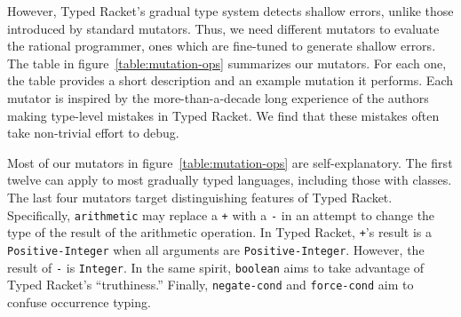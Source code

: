However, Typed Racket's gradual type system detects shallow errors, unlike those introduced by standard mutators.
Thus, we need different mutators to evaluate the rational programmer, ones which are fine-tuned to generate shallow errors.
The table in figure~\ref{table:mutation-ops} summarizes our mutators.
For each one, the table provides a short description and an example
mutation it performs. Each mutator is inspired by the more-than-a-decade
long experience of the authors making type-level mistakes in Typed Racket.
We find that these mistakes often take non-trivial effort to debug.

Most of our mutators in figure~\ref{table:mutation-ops} are self-explanatory.
The first twelve can apply to most gradually typed languages, including those with classes.
The last four mutators target distinguishing features of Typed Racket.
Specifically, \texttt{arithmetic} may replace a \texttt{+} with a \texttt{-}
in an attempt to change the type of the result of the arithmetic
operation. In Typed Racket, \texttt{+}'s result is a
\texttt{Positive-Integer} when all arguments are
\texttt{Positive-Integer}. However, the result of \texttt{-} is
\texttt{Integer}. In the same spirit, \texttt{boolean} aims to take
advantage of Typed Racket's ``truthiness.'' Finally, \texttt{negate-cond} and \texttt{force-cond}
aim to confuse occurrence typing.


